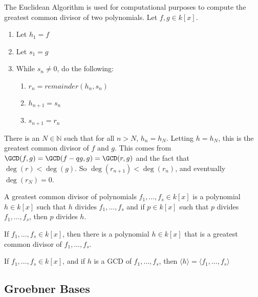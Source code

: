 \documentclass[crop=false,class=book]{standalone}
\begin{document}
\begin{remark}
The Euclidean Algorithm is used for computational purposes to compute the greatest common divisor of two polynomials. Let $f,g\in k[x]$.
\begin{enumerate}
    \item Let $h_{1}=f$
    \item Let $s_{1}=g$
    \item While $s_{n}\ne 0$, do the following:
    \begin{enumerate}
        \item $r_{n}=remainder(h_{n},s_{n})$
        \item $h_{n+1}=s_{n}$
        \item $s_{n+1}=r_{n}$
    \end{enumerate}
\end{enumerate}
There is an $N\in \mathbb{N}$ such that for all $n>N$, $h_n = h_N$. Letting $h = h_N$, this is the greatest common divisor of $f$ and $g$. This comes from $\GCD(f,g)=\GCD(f-qg,g)=\GCD(r,g)$ and the fact that $\deg(r)<\deg(g)$. So $\deg(r_{n+1})<\deg(r_{n})$, and eventually $\deg(r_{N})=0$.
\end{remark}
\begin{definition}
A greatest common divisor of polynomials $f_1,\hdots, f_s \in k[x]$ is a polynomial $h\in k[x]$ such that $h$ divides $f_1,\hdots, f_s$ and if $p\in k[x]$ such that $p$ divides $f_1,\hdots, f_s$, then $p$ divides $h$.
\end{definition}
\begin{theorem}
If $f_{1},\hdots, f_{s}\in k[x]$, then there is a polynomial $h\in k[x]$ that is a greatest common divisor of $f_{1},\hdots,f_{s}$.
\end{theorem}
\begin{theorem}
If $f_{1},\hdots,f_{s}\in k[x]$, and if $h$ is a GCD of $f_{1},\hdots, f_{s}$, then $\langle h\rangle=\langle f_{1},\hdots, f_{s}\rangle$
\end{theorem}
\subsection{Groebner Bases}
\end{document}
